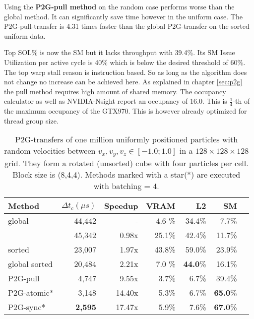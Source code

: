 \documentclass[m,times]{cgMA}
\begin{document}
Using the \textbf{P2G-pull method} on the random case performs worse than the global method. It can significantly save time however in the uniform case. The P2G-pull-transfer is 4.31 times faster than the global P2G-transfer on the sorted uniform data.

Top SOL\% is now the SM but it lacks throughput with 39.4\%. Its SM Issue Utilization per active cycle is 40\% which is below the desired threshold of 60\%. The top warp stall reason is instruction based. So as long as the algorithm does not change no increase can be achieved here. As explained in chapter \ref{sec:p2g} the pull method requires high amount of shared memory. The occupancy calculator as well as NVIDIA-Nsight report an occupancy of 16.0. This is $\frac{1}{4}$-th of the maximum occupancy of the GTX970. This is however already optimized for thread group size.

\begin{table}[htpb]
  \begin{tabular}{ | l | r | r | r | r | r | r |}    \hline
    Method                 &  $\Delta t_c(\mu s)$ &Speedup         &VRAM  & L2   &SM     \\\hline
    global                 &   44,442             &-               &4.6 \%&34.4\%&7.7\%  \\\hline
    \cite{Meyer2015}       &   45,342             &0.98x           &25.1\%&42.4\%&11.7\% \\\hline
    \cite{Meyer2015} sorted&   23,007		  &1.97x           &43.8\%&59.0\%&23.9\% \\\hline
    global sorted          &   20,484		  &2.21x           &7.0 \%&\textbf{44.0}\%&16.1\% \\\hline
    \hline
    P2G-pull               &    4,747             &9.55x           &3.7\% &6.7\% &39.4\%\\\hline
    P2G-atomic*		   &    3,148             &14.40x          &5.3\% &6.7\% &\textbf{65.0}\%\\\hline
    P2G-sync*              &    \textbf{2,595}    &17.47x          &5.9\%&7.6\%  &\textbf{67.0}\%\\\hline
 \end{tabular}
 \caption{P2G-transfers of one million uniformly positioned particles with random velocities between $v_x,v_y,v_z \in [-1.0;1.0]$ in a $128\times 128\times128$ grid. They form a rotated (unsorted) cube with four particles per cell. Block size is (8,4,4). Methods marked with a star(*) are executed with batching = 4.}\label{table:p2g_uniform4}
\end{table}
\end{document}
